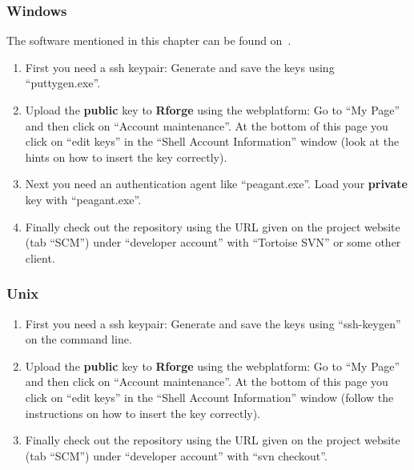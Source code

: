 \documentclass[a4paper]{article}
\begin{document}
\subsubsection{Windows}
The software mentioned in this chapter can be found on~\cite{putty}.
\begin{enumerate}
\item First you need a ssh keypair: Generate and save the keys
  using ``puttygen.exe''.  
\item Upload the \textbf{public} key to \textbf{Rforge} using the webplatform: Go to
  ``My Page'' and then click on ``Account maintenance''. At the bottom
  of this page you click on ``edit keys'' in the ``Shell Account
  Information'' window (look at the hints on how to insert the key correctly).
\item Next you need an authentication agent like ``peagant.exe''. Load
  your \textbf{private} key with ``peagant.exe''.
\item Finally check out the repository using the URL given on the
  project website (tab ``SCM'') under ``developer account'' with
  ``Tortoise SVN'' or some other client.
\end{enumerate}

\subsubsection{Unix}

\begin{enumerate}
\item First you need a ssh keypair: Generate and save the keys
  using ``ssh-keygen'' on the command line.  
\item Upload the \textbf{public} key to \textbf{Rforge} using the
  webplatform: Go to
  ``My Page'' and then click on ``Account maintenance''. At the bottom
  of this page you click on ``edit keys'' in the ``Shell Account
  Information'' window (follow the instructions on how to insert the
  key correctly).
\item Finally check out the repository using the URL given on the
  project website (tab ``SCM'') under ``developer account'' with
  ``svn checkout''.
\end{enumerate}



\end{document}
